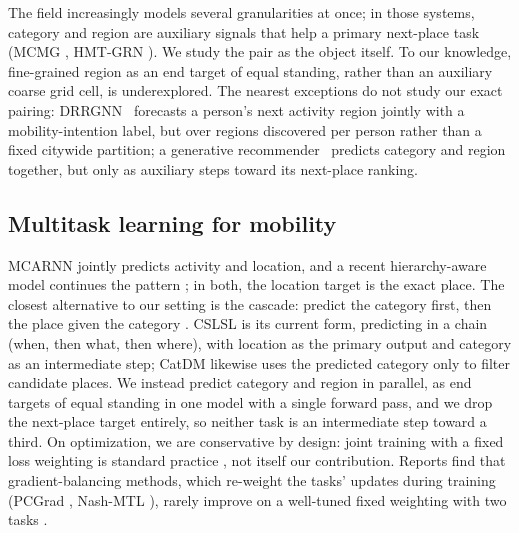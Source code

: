 The field
increasingly models several granularities at once; in those systems, category and
region are auxiliary signals that help a primary next-place task
(MCMG \cite{sun2024mcmg}, HMT-GRN \cite{Lim2022}).
We study the pair as the object itself. To our knowledge, fine-grained region as an
end target of equal standing, rather than an auxiliary coarse grid cell, is
underexplored.
The nearest exceptions do not study our exact pairing:
DRRGNN~\cite{zhu2022drrgnn} forecasts a person's next activity region jointly
with a mobility-intention label, but over regions discovered per person rather
than a fixed citywide partition; a generative recommender~\cite{sun2025kgtb}
predicts category and region together, but only as auxiliary steps toward its
next-place ranking.

\subsection{Multitask learning for mobility}
\label{sec:mobiwac:related-mtl}
MCARNN \cite{Liao2018} jointly predicts activity and
location, and a recent hierarchy-aware model continues the
pattern \cite{wang2025hamtl}; in both, the location target is
the exact place. The closest alternative to our setting is
the cascade: predict the category first, then the place given the
category \cite{ye2013nextmove}. CSLSL
\cite{huang2024cslsl} is its current form, predicting in a chain (when, then what,
then where), with location as the primary output and category as an
intermediate step; CatDM \cite{yu2020catdm} likewise uses the predicted
category only to filter candidate places. We instead predict
category and region in parallel, as end targets of equal standing in one model
with a single forward pass, and we drop the next-place target entirely, so
neither task is an intermediate step toward a third. On optimization, we are conservative by design: joint
training with a fixed loss weighting is standard practice
\cite{caruana1997multitask}, not itself our contribution.
Reports find that gradient-balancing methods, which re-weight
the tasks' updates during training (PCGrad \cite{yu2020pcgrad}, Nash-MTL \cite{nash}), rarely improve on a
well-tuned fixed weighting with two tasks \cite{xin2022domtl}.
